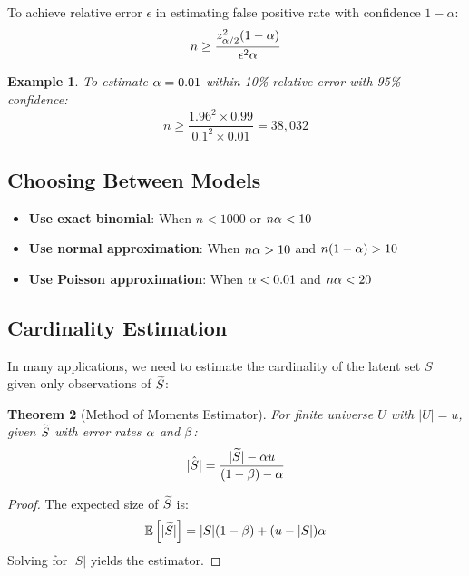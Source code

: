 \documentclass[11pt,final,hidelinks]{article}
\newtheorem{theorem}{Theorem}[section]
\newtheorem{example}[theorem]{Example}
\begin{document}
To achieve relative error $\epsilon$ in estimating false positive rate with confidence $1-\alpha$:
\begin{equation}
n \geq \frac{z_{\alpha/2}^2(1-\alpha)}{\epsilon^2 \alpha}
\end{equation}

\begin{example}
To estimate $\alpha = 0.01$ within 10\% relative error with 95\% confidence:
\begin{equation}
n \geq \frac{1.96^2 \times 0.99}{0.1^2 \times 0.01} = 38,032
\end{equation}
\end{example}

\subsection{Choosing Between Models}

\begin{itemize}
    \item \textbf{Use exact binomial}: When $n < 1000$ or $n\alpha < 10$
    \item \textbf{Use normal approximation}: When $n\alpha > 10$ and $n(1-\alpha) > 10$
    \item \textbf{Use Poisson approximation}: When $\alpha < 0.01$ and $n\alpha < 20$
\end{itemize}

\subsection{Cardinality Estimation}

In many applications, we need to estimate the cardinality of the latent set $S$ given only observations of $\widetilde{S}$:

\begin{theorem}[Method of Moments Estimator]
For finite universe $U$ with $|U| = u$, given $\widetilde{S}$ with error rates $\alpha$ and $\beta$:
\begin{equation}
\hat{|S|} = \frac{|\widetilde{S}| - \alpha u}{(1-\beta) - \alpha}
\end{equation}
\end{theorem}

\begin{proof}
The expected size of $\widetilde{S}$ is:
\begin{equation}
\mathbb{E}\left[|\widetilde{S}|\right] = |S|(1-\beta) + (u-|S|)\alpha
\end{equation}
Solving for $|S|$ yields the estimator.
\end{proof}
\end{document}
